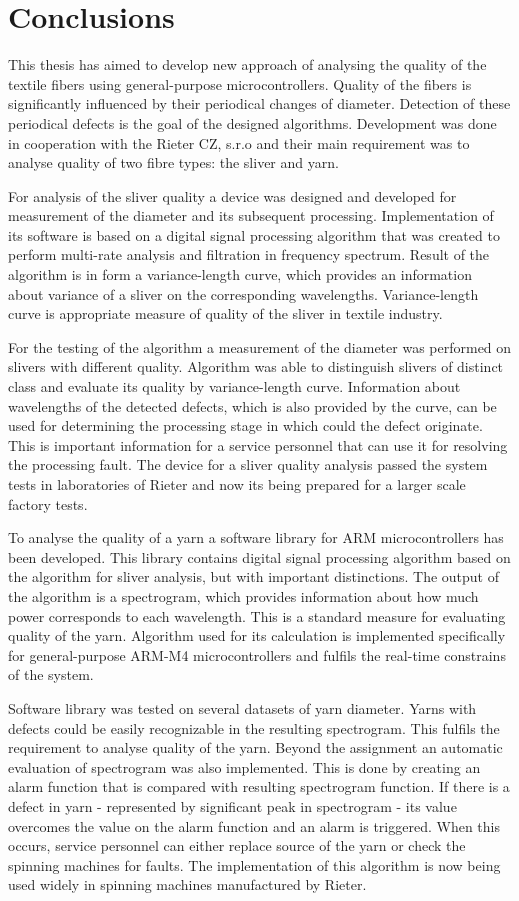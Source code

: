 \documentclass[twoside]{ctuthesis}
\theoremstyle{plain}
\theoremstyle{definition}
\theoremstyle{note}
\begin{document}
\chapter{Conclusions}
This thesis has aimed to develop new approach of analysing the quality of the textile fibers using general-purpose microcontrollers. Quality of the fibers is significantly influenced by their periodical changes of diameter. Detection of these periodical defects is the goal of the designed algorithms. Development was done in cooperation with the Rieter CZ, s.r.o and their main requirement was to analyse quality of two fibre types: the sliver and yarn. 

For analysis of the sliver quality a device was designed and developed for measurement of the diameter and its subsequent processing. Implementation of its software is based on a digital signal processing algorithm that was created to perform multi-rate analysis and filtration in frequency spectrum. Result of the algorithm is in form a variance-length curve, which provides an information about variance of a sliver on the corresponding wavelengths. Variance-length curve is appropriate measure of quality of the sliver in textile industry.

For the testing of the algorithm a measurement of the diameter was performed on slivers with different quality. Algorithm was able to distinguish slivers of distinct class and evaluate its quality by variance-length curve. Information about wavelengths of the detected defects, which is also provided by the curve, can be used for determining the processing stage in which could the defect originate. This is important information for a service personnel that can use it for resolving the processing fault. The device for a sliver quality analysis passed the system tests in laboratories of Rieter and now its being prepared for a larger scale factory tests.

To analyse the quality of a yarn a software library for ARM microcontrollers has been developed. This library contains digital signal processing algorithm based on the algorithm for sliver analysis, but with important distinctions. The output of the algorithm is a spectrogram, which provides information about how much power corresponds to each wavelength. This is a standard measure for evaluating quality of the yarn. Algorithm used for its calculation is implemented specifically for general-purpose ARM-M4 microcontrollers and fulfils the real-time constrains of the system.

Software library was tested on several datasets of yarn diameter. Yarns with defects could be easily recognizable in the resulting spectrogram. This fulfils the requirement to analyse quality of the yarn. Beyond the assignment an automatic evaluation of spectrogram was also implemented. This is done by creating an alarm function that is compared with resulting spectrogram function. If there is a defect in yarn - represented by significant peak in spectrogram - its value overcomes the value on the alarm function and an alarm is triggered. When this occurs, service personnel can either replace source of the yarn or check the spinning machines for faults. The implementation of this algorithm is now being used widely in spinning machines manufactured by Rieter.
\end{document}
